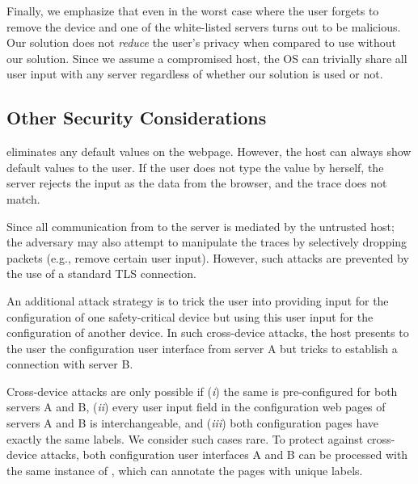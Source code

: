 Finally, we emphasize that even in the worst case where the user forgets to remove the device and one of the white-listed servers turns out to be malicious. Our solution does not \emph{reduce} the user's privacy when compared to use without our solution. Since we assume a compromised host, the OS can trivially share all user input with any server regardless of whether our solution is used or not.



\subsection{Other Security Considerations}

 \name eliminates any default values on the webpage. However, the host can always show default values to the user. If the user does not type the value by herself, the server rejects the input as the data from the browser, and the trace does not match.

 Since all communication from \device to the server is mediated by the untrusted host; the adversary may also attempt to manipulate the traces by selectively dropping packets (e.g., remove certain user input). However, such attacks are prevented by the use of a standard TLS connection.

 An additional attack strategy is to trick the user into providing input for the configuration of one safety-critical device but using this user input for the configuration of another device. In such cross-device attacks, the host presents to the user the configuration user interface from server A but tricks \device to establish a connection with server B.

Cross-device attacks are only possible if (\emph{i}) the same \device is pre-configured for both servers A and B, (\emph{ii}) every user input field in the configuration web pages of servers A and B is interchangeable, and (\emph{iii}) both configuration pages have exactly the same labels. We consider such cases rare. 
To protect against cross-device attacks, both configuration user interfaces A and B can be processed with the same instance of \tool, which can annotate the pages with unique labels.




